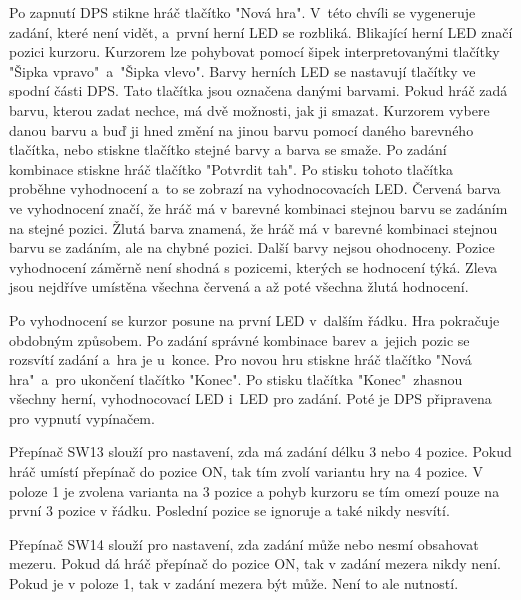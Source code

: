Po zapnutí DPS stikne hráč tlačítko "Nová hra". V~této chvíli se vygeneruje zadání, které není vidět, a~první herní LED se 
rozbliká. Blikající herní LED značí pozici kurzoru. 
Kurzorem lze pohybovat pomocí šipek interpretovanými tlačítky "Šipka vpravo"\  a~"Šipka vlevo". Barvy herních LED se nastavují 
tlačítky ve spodní části DPS. Tato tlačítka jsou označena danými barvami. Pokud hráč zadá barvu, kterou zadat nechce, má dvě možnosti,
jak ji smazat. Kurzorem vybere danou barvu a buď ji hned změní na jinou barvu pomocí daného barevného tlačítka, nebo stiskne tlačítko 
stejné barvy a barva se smaže. 
Po zadání kombinace stiskne hráč tlačítko "Potvrdit tah". Po stisku tohoto tlačítka proběhne vyhodnocení a~to se zobrazí na 
vyhodnocovacích LED. 
Červená barva ve vyhodnocení značí, že hráč má v barevné kombinaci stejnou barvu se zadáním na stejné pozici. Žlutá barva znamená,
že hráč má v barevné kombinaci stejnou barvu se zadáním, ale na chybné pozici. Další barvy nejsou ohodnoceny. Pozice vyhodnocení
záměrně není shodná s pozicemi, kterých se hodnocení týká. Zleva jsou nejdříve umístěna všechna červená a až poté všechna žlutá 
hodnocení.

Po vyhodnocení se kurzor posune na první LED v~dalším řádku. Hra pokračuje obdobným způsobem.
Po zadání správné kombinace barev a~jejich pozic se rozsvítí zadání a~hra je u~konce. Pro novou hru stiskne hráč tlačítko
"Nová hra"\  a~pro ukončení tlačítko "Konec".
Po stisku tlačítka "Konec"\  zhasnou všechny herní, vyhodnocovací LED i~LED pro zadání. Poté je DPS připravena pro vypnutí
vypínačem.

Přepínač SW13 slouží pro nastavení, zda má zadání délku 3 nebo 4 pozice. Pokud hráč umístí přepínač do pozice ON, tak tím 
zvolí variantu hry na 4 pozice. V poloze 1 je zvolena varianta na 3 pozice a pohyb kurzoru se tím omezí pouze na první 3 pozice 
v řádku. Poslední pozice se ignoruje a také nikdy nesvítí.

Přepínač SW14 slouží pro nastavení, zda zadání může nebo nesmí obsahovat mezeru. Pokud dá hráč přepínač do pozice ON, 
tak v zadání mezera nikdy není. Pokud je v poloze 1, tak v zadání mezera být může. Není to ale nutností. 

